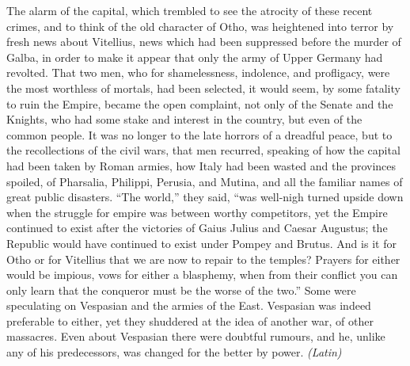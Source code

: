 The alarm of the capital, which trembled to see the atrocity of these recent crimes, and to think of the old character of Otho, was heightened into terror by fresh news about Vitellius, news which had been suppressed before the murder of Galba, in order to make it appear that only the army of Upper Germany had revolted. That two men, who for shamelessness, indolence, and profligacy, were the most worthless of mortals, had been selected, it would seem, by some fatality to ruin the Empire, became the open complaint, not only of the Senate and the Knights, who had some stake and interest in the country, but even of the common people. It was no longer to the late horrors of a dreadful peace, but to the recollections of the civil wars, that men recurred, speaking of how the capital had been taken by Roman armies, how Italy had been wasted and the provinces spoiled, of Pharsalia, Philippi, Perusia, and Mutina, and all the familiar names of great public disasters. ``The world,'' they said, ``was well-nigh turned upside down when the struggle for empire was between worthy competitors, yet the Empire continued to exist after the victories of Gaius Julius and Caesar Augustus; the Republic would have continued to exist under Pompey and Brutus. And is it for Otho or for Vitellius that we are now to repair to the temples? Prayers for either would be impious, vows for either a blasphemy, when from their conflict you can only learn that the conqueror must be the worse of the two.'' Some were speculating on Vespasian and the armies of the East. Vespasian was indeed preferable to either, yet they shuddered at the idea of another war, of other massacres. Even about Vespasian there were doubtful rumours, and he, unlike any of his predecessors, was changed for the better by power. \emph{(Latin)}


